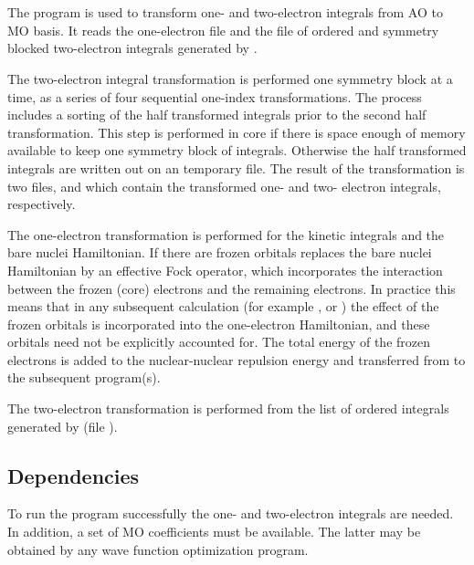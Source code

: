 
\section{}
\label{UG:sec:motra}

The program
 is used to transform one-{} and two-{}electron
integrals from AO to MO basis. It reads the
one-{}electron file and the file of ordered
and symmetry blocked two-{}electron integrals generated by
.

The two-{}electron integral transformation is performed
one symmetry block at a time, as a series of four
sequential one-index transformations. The process
includes a sorting of the half transformed integrals
prior to the second half transformation. This step is
performed in core if there is space enough of memory
available to keep one symmetry block of integrals.
Otherwise the half transformed integrals are written
out on an temporary file. The result of the transformation
is two files,  and  which
contain the transformed one-{} and two-{}
electron integrals, respectively.

The one-{}electron transformation is performed for the
kinetic integrals and the bare nuclei Hamiltonian. If there
are frozen orbitals  replaces the bare nuclei
Hamiltonian by an effective Fock operator, which incorporates
the interaction between the frozen (core) electrons and the
remaining electrons. In practice this means that in any
subsequent calculation (for example ,
 or ) the effect of the frozen
orbitals is incorporated into the one-{}electron Hamiltonian,
and these orbitals need not be explicitly accounted for. The
total energy of the frozen electrons is added to the
nuclear-{}nuclear repulsion energy and transferred from
 to the subsequent program(s).

The two-{}electron transformation is performed from the list of ordered
integrals generated by
 (file ).

\subsection{Dependencies}
\label{UG:sec:motra_dependencies}
To run the program  successfully the one-{}
and two-{}electron integrals are needed. In addition, a
set of MO coefficients must be available. The latter may
be obtained by any wave function optimization program.

